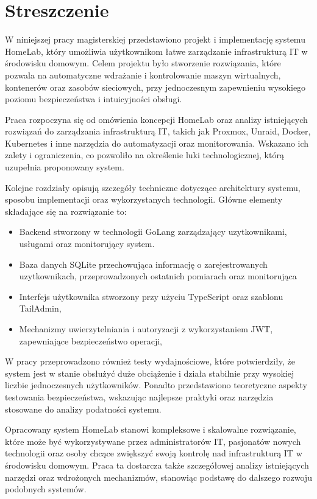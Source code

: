 \documentclass[a4paper,12pt]{report}
\begin{document}


\section*{Streszczenie}

W niniejszej pracy magisterskiej przedstawiono projekt i implementację systemu HomeLab, który umożliwia użytkownikom łatwe zarządzanie infrastrukturą IT w środowisku domowym. Celem projektu było stworzenie rozwiązania, które pozwala na automatyczne wdrażanie i kontrolowanie maszyn wirtualnych, kontenerów oraz zasobów sieciowych, przy jednoczesnym zapewnieniu wysokiego poziomu bezpieczeństwa i intuicyjności obsługi.

Praca rozpoczyna się od omówienia koncepcji HomeLab oraz analizy istniejących rozwiązań do zarządzania infrastrukturą IT, takich jak Proxmox, Unraid, Docker, Kubernetes i inne narzędzia do automatyzacji oraz monitorowania. Wskazano ich zalety i ograniczenia, co pozwoliło na określenie luki technologicznej, którą uzupełnia proponowany system.

Kolejne rozdziały opisują szczegóły techniczne dotyczące architektury systemu, sposobu implementacji oraz wykorzystanych technologii. Główne elementy składające się na rozwiązanie to:
\begin{itemize}
    \item Backend stworzony w technologii GoLang zarządzający uzytkownikami, usługami oraz monitorujący system.
    \item Baza danych SQLite przechowująca informację o zarejestrowanych uzytkownikach, przeprowadzonych ostatnich pomiarach oraz monitorująca
    \item Interfejs użytkownika stworzony przy użyciu TypeScript oraz szablonu TailAdmin,
    \item Mechanizmy uwierzytelniania i autoryzacji z wykorzystaniem JWT, zapewniające bezpieczeństwo operacji,
\end{itemize}

W pracy przeprowadzono również testy wydajnościowe, które potwierdziły, że system jest w stanie obsłużyć duże obciążenie i działa stabilnie przy wysokiej liczbie jednoczesnych użytkowników. Ponadto przedstawiono teoretyczne aspekty testowania bezpieczeństwa, wskazując najlepsze praktyki oraz narzędzia stosowane do analizy podatności systemu.

Opracowany system HomeLab stanowi kompleksowe i skalowalne rozwiązanie, które może być wykorzystywane przez administratorów IT, pasjonatów nowych technologii oraz osoby chcące zwiększyć swoją kontrolę nad infrastrukturą IT w środowisku domowym. Praca ta dostarcza także szczegółowej analizy istniejących narzędzi oraz wdrożonych mechanizmów, stanowiąc podstawę do dalszego rozwoju podobnych systemów.
\end{document}
